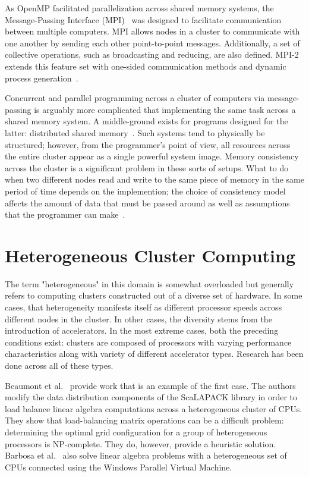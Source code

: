 As OpenMP facilitated parallelization across shared memory systems,
the Message-Passing Interface (MPI)~\cite{mpi_design} was designed to
facilitate communication between multiple computers. MPI allows nodes
in a cluster to communicate with one another by sending each other
point-to-point messages. Additionally, a set of collective operations,
such as broadcasting and reducing, are also defined. MPI-2 extends this
feature set with one-sided communication methods and dynamic process
generation~\cite{mpi2}.

Concurrent and parallel programming across a cluster of computers via
message-passing is arguably more complicated that implementing the same
task across a shared memory system. A middle-ground exists for programs
designed for the latter: distributed shared memory~\cite{dsm}. Such
systems tend to physically be structured; however, from the programmer's
point of view, all resources across the entire cluster appear as a
single powerful system image. Memory consistency across the cluster
is a significant problem in these sorts of setups. What to do when two
different nodes read and write to the same piece of memory in the same
period of time depends on the implemention; the choice of consistency
model affects the amount of data that must be passed around as well as
assumptions that the programmer can make~\cite{dsm_survey}.

\section{Heterogeneous Cluster Computing}

The term "heterogeneous" in this domain is somewhat overloaded but
generally refers to computing clusters constructed out of a diverse set of
hardware. In some cases, that heterogeneity manifests itself as different
processor speeds across different nodes in the cluster. In other cases,
the diversity stems from the introduction of accelerators. In the most
extreme cases, both the preceding conditions exist: clusters are composed
of processors with varying performance characteristics along with variety
of different accelerator types.  Research has been done across all of
these types.

Beaumont et al.~\cite{scalapack} provide work that is an example of
the first case. The authors modify the data distribution components
of the ScaLAPACK library in order to load balance linear algebra
computations across a heterogeneous cluster of CPUs. They show that
load-balancing matrix operations can be a difficult problem: determining
the optimal grid configuration for a group of heterogeneous processors
is NP-complete. They do, however, provide a heuristic solution. Barbosa
et al.~\cite{linear_algebra} also solve linear algebra problems with a
heterogeneous set of CPUs connected using the Windows Parallel Virtual
Machine.

